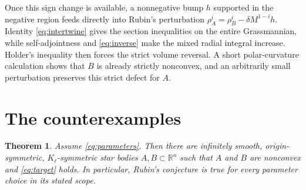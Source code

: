 \documentclass[11pt]{article}
\newtheorem{theorem}{Theorem}
\newcommand{\R}{\mathbb R}
\begin{document}
Once this sign change is available, a nonnegative bump $h$ supported in the
negative region feeds directly into Rubin's perturbation
$\rho_A^i=\rho_B^i-\delta M^{1-i}h$.  Identity
\eqref{eq:intertwine} gives the section inequalities on the entire
Grassmannian, while self-adjointness and \eqref{eq:inverse} make the mixed
radial integral increase.  Holder's inequality then forces the strict volume
reversal.  A short polar-curvature calculation shows that $B$ is already
strictly nonconvex, and an arbitrarily small perturbation preserves this
strict defect for $A$.

\section{The counterexamples}

\begin{theorem}\label{thm:main}
Assume \eqref{eq:parameters}.  Then there are infinitely smooth,
origin-symmetric, $K_\ell$-symmetric star bodies $A,B\subset\R^n$ such that
$A$ and $B$ are nonconvex and \eqref{eq:target} holds.  In particular,
Rubin's conjecture is true for every parameter choice in its stated scope.
\end{theorem}
\end{document}
